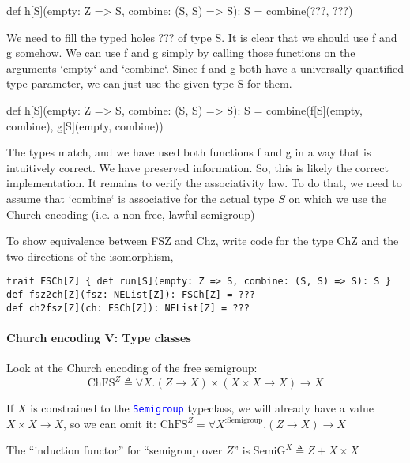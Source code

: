 def h{[}S{]}(empty: Z => S, combine: (S, S) => S): S = combine(???,
???)

We need to fill the typed holes ??? of type S. It is clear that we
should use f and g somehow. We can use f and g simply by calling those
functions on the arguments `empty` and `combine`. Since f and g both
have a universally quantified type parameter, we can just use the
given type S for them.

def h{[}S{]}(empty: Z => S, combine: (S, S) => S): S = combine(f{[}S{]}(empty,
combine), g{[}S{]}(empty, combine))

The types match, and we have used both functions f and g in a way
that is intuitively correct. We have preserved information. So, this
is likely the correct implementation. It remains to verify the associativity
law. To do that, we need to assume that `combine` is associative for
the actual type $S$ on which we use the Church encoding (i.e. a non-free,
lawful semigroup)

To show equivalence between FSZ and Chz, write code for the type ChZ
and the two directions of the isomorphism,
\begin{lstlisting}
trait FSCh[Z] { def run[S](empty: Z => S, combine: (S, S) => S): S }
def fsz2ch[Z](fsz: NEList[Z]): FSCh[Z] = ???
def ch2fsz[Z](ch: FSCh[Z]): NEList[Z] = ???
\end{lstlisting}

\paragraph{Church encoding V: Type classes}

Look at the Church encoding of the free semigroup:{\footnotesize{}
\[
\text{ChFS}^{Z}\triangleq\forall X.\left(Z\rightarrow X\right)\times\left(X\times X\rightarrow X\right)\rightarrow X
\]
}{\footnotesize\par}

If $X$ is constrained to the \texttt{\textcolor{blue}{\footnotesize{}Semigroup}}
typeclass, we will already have a value {\footnotesize{}$X\times X\rightarrow X$},
so we can omit it: {\footnotesize{}$\text{ChFS}^{Z}=\forall X^{:\text{Semigroup}}.\left(Z\rightarrow X\right)\rightarrow X$}{\footnotesize\par}

The \textsf{``}induction functor\textsf{''} for \textsf{``}semigroup over $Z$\textsf{''} is {\footnotesize{}$\text{SemiG}^{X}\triangleq Z+X\times X$}{\footnotesize\par}

